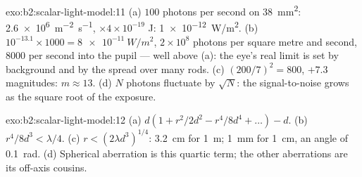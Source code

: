 \begin{solution}{exo:b2:scalar-light-model:11}
(a) $100$ photons per second on \qty{38}{mm^2}: \qty{2.6e6}{m^{-2}.s^{-1}}, $\times4 \times
10^{-19}$ J: \qty{1e-12}{W/m^2}. (b) $10^{-13.1} \times 1000 = \qty{8e-11}{W/m^2}$, $2 \times 10^8$
photons per square metre and second, $8000$ per second into the pupil
--- well above (a): the eye's real limit is set by background and by
the spread over many rods. (c) $(200/7)^2 = 800$, $+7.3$ magnitudes: $m \approx
13$. (d) $N$ photons fluctuate by $\sqrt N$: the signal-to-noise grows as
the square root of the exposure.
\end{solution}

\begin{solution}{exo:b2:scalar-light-model:12}
(a) $d(1 + r^2/2d^2 - r^4/8d^4 + \dots) - d$. (b) $r^4/8d^3 < \lambda/4$. (c) $r <
(2\lambda d^3)^{1/4}$: \qty{3.2}{cm} for \qty{1}{m}; \qty{1}{mm} for \qty{1}{cm}, an angle of
\qty{0.1}{rad}. (d) Spherical aberration is this quartic term; the other
aberrations are its off-axis cousins.
\end{solution}

